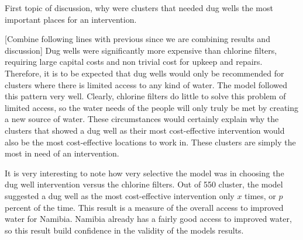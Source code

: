 First topic of discussion, why were clusters that needed dug wells the most important places for an intervention. 

[Combine following lines with previous since we are combining results and discussion]
Dug wells were significantly more expensive than chlorine filters, requiring large capital costs and non trivial cost for upkeep and repairs. 
Therefore, it is to be expected that dug wells would only be recommended for clusters where there is limited access to any kind of water. 
The model followed this pattern very well.
Clearly, chlorine filters do little to solve this problem of limited access, so the water needs of the people will only truly be met by creating a new source of water. 
These circumstances would certainly explain why the clusters that showed a dug well as their most cost-effective intervention would also be the most cost-effective locations to work in. These clusters are simply the most in need of an intervention.  

It is very interesting to note how very selective the model was in choosing the dug well intervention versus the chlorine filters.
Out of 550 cluster, the model suggested a dug well as the most cost-effective intervention only $x$ times, or $p$ percent of the time.
This result is a measure of the overall access to improved water for Namibia. 
Namibia already has a fairly good access to improved water, so this result build confidence in the validity of the models results.